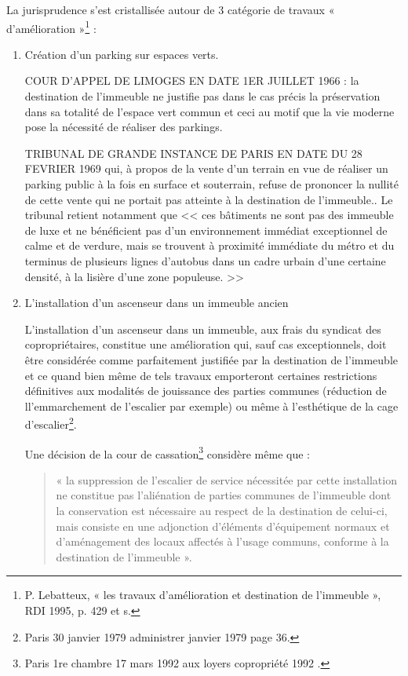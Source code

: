 				La jurisprudence s’est cristallisée autour de 3 catégorie de travaux « d’amélioration »\footnote{P. Lebatteux, « les travaux d’amélioration et destination de l’immeuble », RDI 1995, p. 429 et s.} :
				\begin{enumerate}
					\item Création d’un parking sur espaces verts.
					
					COUR D'APPEL DE LIMOGES EN DATE 1ER JUILLET 1966 : la destination de l’immeuble ne justifie pas dans le cas précis la préservation dans sa totalité de l'espace vert commun et ceci au motif que la vie moderne pose la nécessité de réaliser des parkings.
					
					TRIBUNAL DE GRANDE INSTANCE DE PARIS EN DATE DU 28 FEVRIER 1969 qui, à propos de la vente d'un terrain en vue de réaliser un parking public à la fois en surface et souterrain, refuse de prononcer la nullité de cette vente qui ne portait pas atteinte à la destination de l’immeuble.. Le tribunal retient notamment que << ces bâtiments ne sont pas des immeuble de luxe et ne bénéficient pas d'un environnement immédiat exceptionnel de calme et de verdure, mais se trouvent à proximité immédiate du métro et du terminus de plusieurs lignes d'autobus dans un cadre urbain d'une certaine densité, à la lisière d'une zone populeuse. >>
					
					\item L'installation d’un ascenseur dans un immeuble ancien
					
					L’installation d'un ascenseur dans un immeuble, aux frais du syndicat des copropriétaires, constitue une amélioration qui, sauf cas exceptionnels, doit être considérée comme parfaitement justifiée par la destination de l'immeuble et ce quand bien même de tels travaux emporteront certaines restrictions définitives aux modalités de jouissance des parties communes (réduction de ll’emmarchement de l'escalier par exemple) ou même à l’esthétique de la cage d'escalier\footnote{Paris 30 janvier 1979 administrer janvier 1979 page 36.}.
					
					Une décision de la cour de cassation\footnote{Paris 1re chambre 17 mars 1992 aux loyers copropriété 1992 .} considère même que :
					\begin{quote}
						« la suppression de l’escalier de service nécessitée par cette installation ne constitue pas l'aliénation de parties communes de l'immeuble dont la conservation est nécessaire au respect de la destination de celui-ci, mais consiste en une adjonction d’éléments d'équipement normaux et d'aménagement des locaux affectés à l'usage communs, conforme à la destination de l'immeuble ».
					\end{quote}
					

\end{enumerate}
